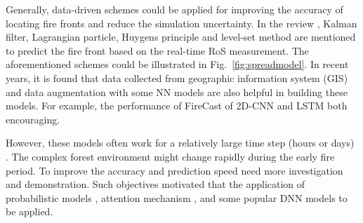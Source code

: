 Generally, data-driven schemes could be applied for improving the accuracy of locating fire fronts and reduce the simulation uncertainty. In the review \cite{zhai2020learning}, Kalman filter, Lagrangian particle, Huygens principle and level-set method are mentioned to predict the fire front based on the real-time RoS measurement.
The aforementioned schemes could be illustrated in Fig.~\ref{fig:spreadmodel}. In recent years, it is found that data collected from geographic information system (GIS) and data augmentation with some NN models are also helpful in building these models. For example, the performance of FireCast of 2D-CNN \cite{radke2019firecast} and LSTM \cite{huot2020deep} both encouraging.\par 
However, these models often work for a relatively large time step (hours or days) \cite{burge2020convolutional}. The complex forest environment might change rapidly during the early fire period. To improve the accuracy and prediction speed need more investigation and demonstration. Such objectives motivated that the application of probabilistic models \cite{pimont2021prediction}, attention mechanism \cite{vaswani2021scaling}, and some popular DNN models to be applied.\par
